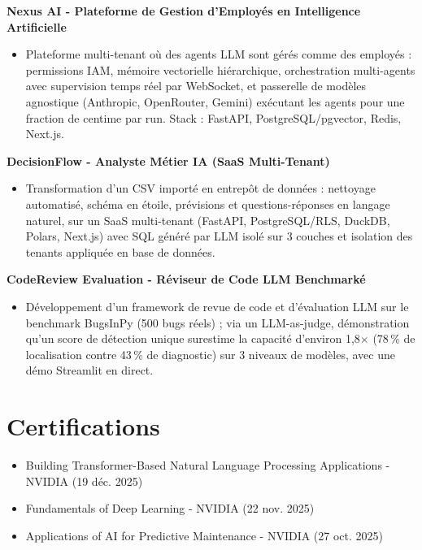 \documentclass[11pt,a4paper]{article}
\newcommand{\proj}[1]{\textbf{#1}\par}
\begin{document}
\proj{Nexus AI - Plateforme de Gestion d'Employés en Intelligence Artificielle}
\begin{itemize}
  \item Plateforme multi-tenant où des agents LLM sont gérés comme des employés : permissions IAM, mémoire
        vectorielle hiérarchique, orchestration multi-agents avec supervision temps réel par WebSocket, et
        passerelle de modèles agnostique (Anthropic, OpenRouter, Gemini) exécutant les agents pour une
        fraction de centime par run. Stack : FastAPI, PostgreSQL/pgvector, Redis, Next.js.
\end{itemize}

\proj{DecisionFlow - Analyste Métier IA (SaaS Multi-Tenant)}
\begin{itemize}
  \item Transformation d'un CSV importé en entrepôt de données : nettoyage automatisé, schéma en étoile,
        prévisions et questions-réponses en langage naturel, sur un SaaS multi-tenant (FastAPI,
        PostgreSQL/RLS, DuckDB, Polars, Next.js) avec SQL généré par LLM isolé sur 3 couches et isolation
        des tenants appliquée en base de données.
\end{itemize}

\proj{CodeReview Evaluation - Réviseur de Code LLM Benchmarké}
\begin{itemize}
  \item Développement d'un framework de revue de code et d'évaluation LLM sur le benchmark BugsInPy
        (500 bugs réels) ; via un LLM-as-judge, démonstration qu'un score de détection unique surestime la
        capacité d'environ 1,8$\times$ (78\,\% de localisation contre 43\,\% de diagnostic) sur 3 niveaux de
        modèles, avec une démo Streamlit en direct.
\end{itemize}

\section{Certifications}
\begin{itemize}
  \item Building Transformer-Based Natural Language Processing Applications - NVIDIA {\color{muted}(19 déc. 2025)}
  \item Fundamentals of Deep Learning - NVIDIA {\color{muted}(22 nov. 2025)}
  \item Applications of AI for Predictive Maintenance - NVIDIA {\color{muted}(27 oct. 2025)}
\end{itemize}
\end{document}
